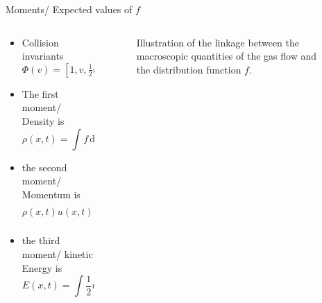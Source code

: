 \documentclass[usenames,dvipsnames,Nike]{tuberlinbeamer}
\begin{document}
\begin{frame}[fragile]{Moments/ Expected values of $f$}
	\begin{columns}
		\begin{column}{.5\textwidth}
				\begin{itemize}
				\item Collision invariants $\Phi(v)=[1,v,\frac{1}{2}v^2]$
				\item The first moment/ Density is
				\begin{equation}
					\rho(x,t) = \int\! f \,\mathrm{d}v \,,
				\end{equation}
				\item the second moment/ Momentum is
				\begin{equation}
					\rho(x,t) u(x,t) = \int\! v f \,\mathrm{d}v \,,
				\end{equation}
				\item the third moment/ kinetic Energy is
				\begin{equation}
					E(x,t) = \int\! \frac{1}{2}v^2 f  \,\mathrm{d}v \,.
				\end{equation}
			\end{itemize}
		\end{column}
		\begin{column}{.5\textwidth}
			\begin{center}
				\begin{figure}
					
					\caption{Illustration of the linkage between the macroscopic quantities of the gas flow and the distribution function \(f\).}
				\end{figure}
			\end{center}
		\end{column}
	\end{columns}
\end{frame}
\end{document}
